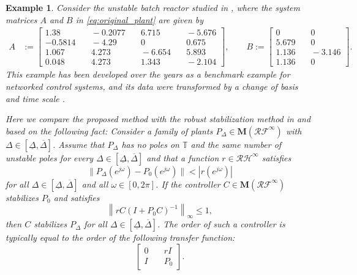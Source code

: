 \documentclass[letterpaper, 12pt, draftcls, onecolumn]{ieeeconf}
\newtheorem{example}[theorem]{Example}
\begin{document}
\begin{example}
Consider the unstable batch reactor studied 
in \cite{Rosenbrock1972}, where
the system matrices $A$ and $B$ in \eqref{eq:original_plant}
are given by
\begin{align*}
A &:= 
\begin{bmatrix}
1.38 &\quad -0.2077 &\quad 6.715 &\quad -5.676 \\
-0.5814 &\quad -4.29 &\quad 0 &\quad 0.675 \\
1.067 &\quad 4.273 &\quad -6.654 &\quad 5.893 \\
0.048 &\quad 4.273 &\quad 1.343 &\quad -2.104
\end{bmatrix},\qquad 
B :=
\begin{bmatrix}
0 &\quad 0 \\
5.679 &\quad 0 \\
1.136 &\quad-3.146 \\
1.136 &\quad 0 
\end{bmatrix}.
\end{align*}
This example has been developed over the years as a benchmark example for networked
control systems, and
its data were transformed by a change of basis
and time scale \cite{Rosenbrock1972}.

Here we compare the proposed method with the robust stabilization method in
\cite{doyle1981} and \cite[Chap.~7]{vidyasagar1985} based on
the following fact: {\em
	Consider a family of plants $P_{\Delta} \in \mathbf{M}(
	\mathcal{RF}^{\infty})$ with $\Delta \in [\underline \Delta, \overline \Delta]$.
	Assume 
	that 
	$P_{\Delta}$ has no poles on $\mathbb{T}$ and the same number of unstable poles for every $\Delta \in [\underline \Delta, \overline \Delta]$
	and
	that a function $r \in \mathcal{RH}^{\infty}$ satisfies
	\begin{equation}
	\label{eq:r_def}
	\|P_{\Delta}(e^{j\omega}) - P_{0}(e^{j\omega}) \| < |r(e^{j\omega})|
	\end{equation} 
	for all $\Delta \in [\underline \Delta, \overline \Delta]$
	and all $\omega \in [0,2\pi]$.
	If the controller $C \in \mathbf{M}(
	\mathcal{RF}^{\infty})$ 
	stabilizes $P_0$ and
	satisfies 
	\begin{equation}
	\label{eq:suff_cond_conv}
	\left\|
	r  C (I + P_0C)^{-1}
	\right\|_{\infty} \leq 1,
	\end{equation}
	then $C$ stabilizes $P_{\Delta}$ for all $\Delta \in [\underline \Delta, \overline \Delta]$.}
The order of such a controller is typically equal to
the order of the following transfer function:
\[\begin{bmatrix}
0 &\quad  rI \\ I &\quad  P_0
\end{bmatrix}.\]


\end{example}
\end{document}
